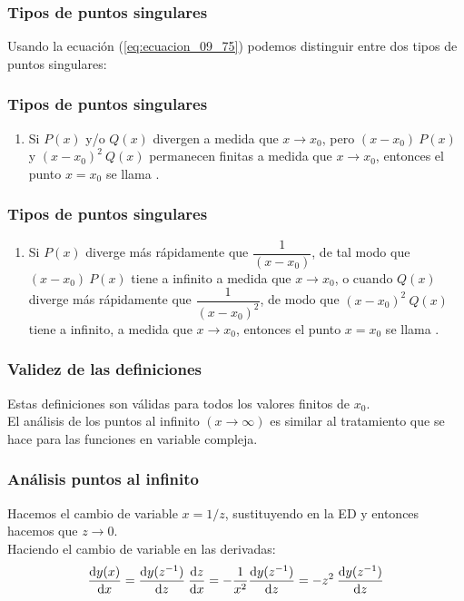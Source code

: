 \documentclass[12pt]{beamer}
\begin{document}
\begin{frame}
\frametitle{Tipos de puntos singulares}
Usando la ecuación (\ref{eq:ecuacion_09_75}) podemos distinguir entre dos tipos de puntos singulares:
\end{frame}
\begin{frame}
\frametitle{Tipos de puntos singulares}
\begin{enumerate}
\item Si $P (x)$ y/o $Q (x)$ divergen a medida que $x \to x_{0}$, pero $(x - x_{0}) \: P (x)$ y $(x - x_{0})^{2} \: Q (x)$ permanecen finitas a medida que $x \to x_{0}$, \pause entonces el punto $x = x_{0}$ se llama .
\seti
\end{enumerate}
\end{frame}
\begin{frame}
\frametitle{Tipos de puntos singulares}
\begin{enumerate}
\conti 
\item Si $P (x)$ diverge más rápidamente que $\dfrac{1}{(x - x_{0})}$, de tal modo que $(x - x_{0}) \: P (x)$ tiene a infinito a medida que $x \to x_{0}$, \pause o cuando $ Q(x)$ diverge más rápidamente que $\dfrac{1}{(x - x_{0})^{2}}$, de modo que $(x - x_{0})^{2} \: Q(x)$ tiene a infinito, a medida que $x \to x_{0}$, \pause entonces el punto $x = x_{0}$ se llama .
\end{enumerate}
\end{frame}
\begin{frame}
\frametitle{Validez de las definiciones}
Estas definiciones son válidas para todos los valores finitos de $x_{0}$. 
\\
\bigskip
\pause
El análisis de los puntos al infinito $(x \to \infty)$ es similar al tratamiento que se hace para las funciones en variable compleja.
\end{frame}
\begin{frame}
\frametitle{Análisis puntos al infinito}
Hacemos el cambio de variable $x = 1/z$, sustituyendo en la ED y entonces hacemos que $z \to 0$. 
\\
\bigskip
\pause
Haciendo el cambio de variable en las derivadas:
\pause
\begin{align}
\dv{y (x)}{x} = \dv{y (z^{-1})}{z} \: \dv{z}{x} = - \dfrac{1}{x^{2}} \dv{y (z^{-1})}{z} = -z^{2} \: \dv{y (z^{-1})}{z}
\label{eq:ecuacion_09_76}
\end{align}
\end{frame}
\end{document}

